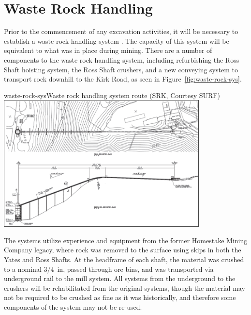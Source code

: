 \section{Waste Rock Handling }
\label{sec:fscf-und-waste-rock}

Prior to the commencement of any excavation activities, it will be necessary to establish a waste rock handling system . The capacity of this system will be equivalent to what was in place during mining. 
There are a number of components to the waste rock handling system, including refurbishing the Ross Shaft hoisting system, the Ross Shaft crushers, and a new conveying system to transport rock downhill to the Kirk Road, as seen in Figure~\ref{fig:waste-rock-sys}. 

\begin{cdrfigure}{waste-rock-sys}{Waste rock handling system route (SRK, Courtesy SURF)}
\includegraphics[width=0.8\textwidth]{waste-rock-sys}
\end{cdrfigure}

The systems utilize experience and equipment from the former Homestake Mining Company legacy, where rock was removed to the surface using skips in both the Yates and Ross Shafts. At the headframe of each shaft, the material was crushed to a nominal $3/4$~in, passed through ore bins, and was transported via underground rail to the mill system. All systems from the underground to the crushers will be rehabilitated from the original systems, though the material may not be required to be crushed as fine as it was historically, and therefore some components of the system may not be re-used.



